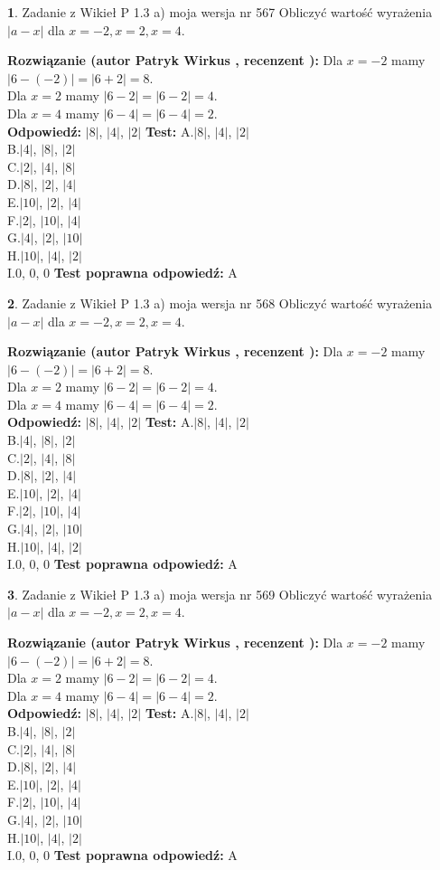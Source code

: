 \documentclass[12pt, a4paper]{article}
\theoremstyle{definition} %
\newtheorem{zad}{}
\newcommand{\zadStart}[1]{\begin{zad}#1\newline}
\newcommand{\zadStop}{\end{zad}}
\newcommand{\rozwStart}[2]{\noindent \textbf{Rozwiązanie (autor #1 , recenzent #2): }\newline}
\newcommand{\rozwStop}{\newline}
\newcommand{\odpStart}{\noindent \textbf{Odpowiedź:}\newline}
\newcommand{\odpStop}{\newline}
\newcommand{\testStart}{\noindent \textbf{Test:}\newline}
\newcommand{\testStop}{\newline}
\newcommand{\kluczStart}{\noindent \textbf{Test poprawna odpowiedź:}\newline}
\newcommand{\kluczStop}{\newline}
\begin{document}
\zadStart{Zadanie z Wikieł P 1.3 a) moja wersja nr 567}
Obliczyć wartość wyrażenia $|a - x|$ dla $x=-2,x=2,x=4$.
\zadStop
\rozwStart{Patryk Wirkus}{}
Dla $x = -2$ mamy $|6 - (-2)| = |6 + 2| = 8$.\\
Dla $x = 2$ mamy $|6 - 2| = |6 - 2| = 4$.\\
Dla $x = 4$ mamy $|6 - 4| = |6 - 4| = 2$.\\
\rozwStop
\odpStart
$|8|$, $|4|$, $|2|$
\odpStop
\testStart
A.$|8|$, $|4|$, $|2|$\\
B.$|4|$, $|8|$, $|2|$\\
C.$|2|$, $|4|$, $|8|$\\
D.$|8|$, $|2|$, $|4|$\\
E.$|10|$, $|2|$, $|4|$\\
F.$|2|$, $|10|$, $|4|$\\
G.$|4|$, $|2|$, $|10|$\\
H.$|10|$, $|4|$, $|2|$\\
I.$0$, $0$, $0$
\testStop
\kluczStart
A
\kluczStop



\zadStart{Zadanie z Wikieł P 1.3 a) moja wersja nr 568}
Obliczyć wartość wyrażenia $|a - x|$ dla $x=-2,x=2,x=4$.
\zadStop
\rozwStart{Patryk Wirkus}{}
Dla $x = -2$ mamy $|6 - (-2)| = |6 + 2| = 8$.\\
Dla $x = 2$ mamy $|6 - 2| = |6 - 2| = 4$.\\
Dla $x = 4$ mamy $|6 - 4| = |6 - 4| = 2$.\\
\rozwStop
\odpStart
$|8|$, $|4|$, $|2|$
\odpStop
\testStart
A.$|8|$, $|4|$, $|2|$\\
B.$|4|$, $|8|$, $|2|$\\
C.$|2|$, $|4|$, $|8|$\\
D.$|8|$, $|2|$, $|4|$\\
E.$|10|$, $|2|$, $|4|$\\
F.$|2|$, $|10|$, $|4|$\\
G.$|4|$, $|2|$, $|10|$\\
H.$|10|$, $|4|$, $|2|$\\
I.$0$, $0$, $0$
\testStop
\kluczStart
A
\kluczStop



\zadStart{Zadanie z Wikieł P 1.3 a) moja wersja nr 569}
Obliczyć wartość wyrażenia $|a - x|$ dla $x=-2,x=2,x=4$.
\zadStop
\rozwStart{Patryk Wirkus}{}
Dla $x = -2$ mamy $|6 - (-2)| = |6 + 2| = 8$.\\
Dla $x = 2$ mamy $|6 - 2| = |6 - 2| = 4$.\\
Dla $x = 4$ mamy $|6 - 4| = |6 - 4| = 2$.\\
\rozwStop
\odpStart
$|8|$, $|4|$, $|2|$
\odpStop
\testStart
A.$|8|$, $|4|$, $|2|$\\
B.$|4|$, $|8|$, $|2|$\\
C.$|2|$, $|4|$, $|8|$\\
D.$|8|$, $|2|$, $|4|$\\
E.$|10|$, $|2|$, $|4|$\\
F.$|2|$, $|10|$, $|4|$\\
G.$|4|$, $|2|$, $|10|$\\
H.$|10|$, $|4|$, $|2|$\\
I.$0$, $0$, $0$
\testStop
\kluczStart
A
\kluczStop
\end{document}
